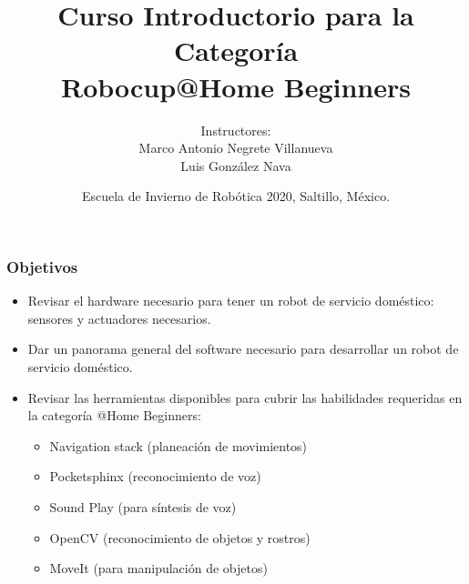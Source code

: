 \documentclass[10pt,spanish,aspectratio=1610]{beamer}
\begin{document}
\renewcommand{\tablename}{Tabla}
\renewcommand{\figurename}{Figura}

\title[Robocup@Home Beginners]{Curso Introductorio para la Categoría\\Robocup@Home Beginners}
\author[Marco Negrete y Luis González]{Instructores: \\ Marco Antonio Negrete Villanueva \\ Luis González Nava}
\date[EIR 2020]{Escuela de Invierno de Robótica 2020, Saltillo, México.}

\begin{frame}
\titlepage
\end{frame}

\begin{frame}\frametitle{Objetivos}
  \begin{itemize}
  \item Revisar el hardware necesario para tener un robot de servicio doméstico: sensores y actuadores necesarios.
  \item Dar un panorama general del software necesario para desarrollar un robot de servicio doméstico.
  \item Revisar las herramientas disponibles para cubrir las habilidades requeridas en la categoría @Home Beginners:
    \begin{itemize}
    \item Navigation stack (planeación de movimientos)
    \item Pocketsphinx (reconocimiento de voz)
    \item Sound Play (para síntesis de voz)
    \item OpenCV (reconocimiento de objetos y rostros)
    \item MoveIt (para manipulación de objetos)
    \end{itemize}
  \end{itemize}
\end{frame}

\end{document}
